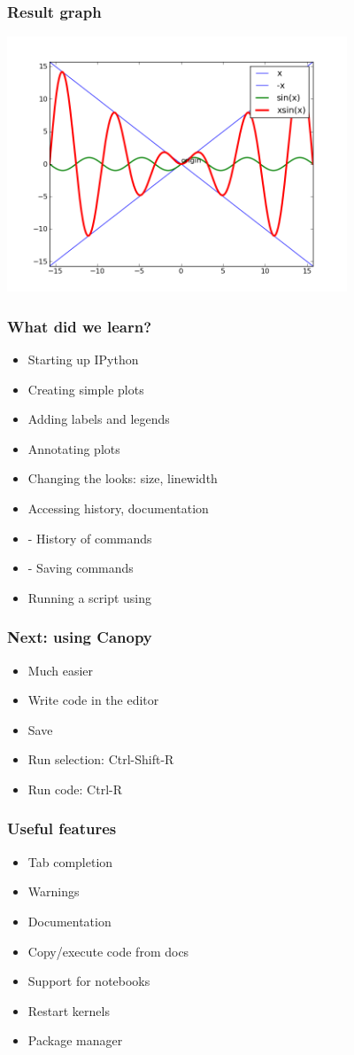 \documentclass[14pt,compress]{beamer}
\newcounter{time}
\newcommand{\inctime}[1]{\addtocounter{time}{#1}{\tiny \thetime\ m}}
\newcommand{\kwrd}[1]{ \texttt{\textbf{\color{blue}{#1}}}  }
\begin{document}
\begin{frame}[fragile]
  \frametitle{Result graph}
  \begin{center}
    \includegraphics[height=3in, interpolate=true]{data/four_plot}
  \end{center}
\end{frame}


\begin{frame}[fragile]
  \frametitle{What did we learn?}
  \begin{itemize}
    \item Starting up IPython
    \item Creating simple plots
    \item Adding labels and legends
    \item Annotating plots
    \item Changing the looks: size, linewidth
    \item Accessing history, documentation
    \item \kwrd{\%hist} - History of commands
    \item \kwrd{\%save} - Saving commands 
    \item Running a script using \kwrd{\%run -i}
  \end{itemize}
  \inctime{30}
\end{frame}

\begin{frame}
  \frametitle{Next: using Canopy}
  \begin{itemize}
      \item Much easier
      \item Write code in the editor
      \item Save
      \item Run selection: Ctrl-Shift-R
      \item Run code: Ctrl-R
  \end{itemize}
\end{frame}

\begin{frame}
  \frametitle{Useful features}
  \begin{itemize}
      \item Tab completion
      \item Warnings
      \item Documentation
      \item Copy/execute code from docs
      \item Support for notebooks
      \item Restart kernels
      \item Package manager
  \end{itemize}
\end{frame}
\end{document}
